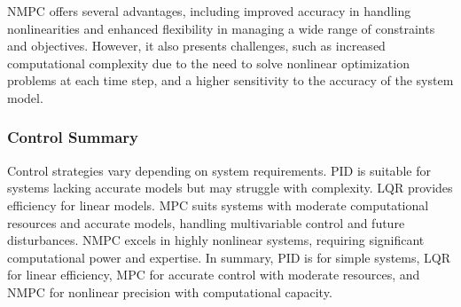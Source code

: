 \documentclass{UoNMCHA}
\numberwithin{equation}{section}
\begin{document}
NMPC offers several advantages, including improved accuracy in handling nonlinearities and enhanced flexibility in managing a wide range of constraints and objectives. However, it also presents challenges, such as increased computational complexity due to the need to solve nonlinear optimization problems at each time step, and a higher sensitivity to the accuracy of the system model.

\subsubsection{Control Summary}

Control strategies vary depending on system requirements. PID is suitable for systems lacking accurate models but may struggle with complexity. LQR provides efficiency for linear models. MPC suits systems with moderate computational resources and accurate models, handling multivariable control and future disturbances. NMPC excels in highly nonlinear systems, requiring significant computational power and expertise. In summary, PID is for simple systems, LQR for linear efficiency, MPC for accurate control with moderate resources, and NMPC for nonlinear precision with computational capacity.

\newpage
\end{document}
